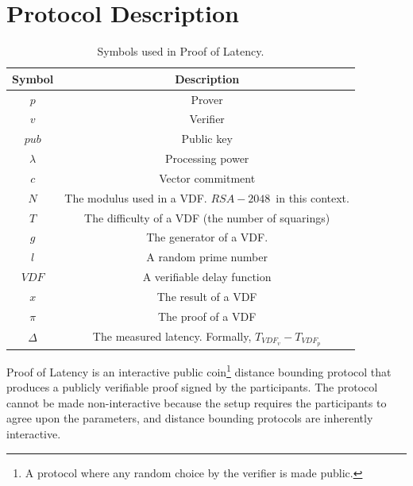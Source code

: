 \section{Protocol Description}
\begin{table}[h!]
	\centering
	\begin{tabular}{ c|c  }
		Symbol        & Description                                             \\
		\hline
		\( p \)       & Prover                                                  \\
		\( v \)       & Verifier                                                \\
		\( pub \)      & Public key                                              \\
		\( \lambda \) & Processing power                                        \\
		\( c \)       & Vector commitment                                       \\
		\( N \)       & The modulus used in a VDF. \(RSA-2048\)~in this context.   \\

		\( T \)       & The difficulty of a VDF (the number of squarings)       \\
		\( g \)       & The generator of a VDF.                                 \\
		\( l \)       & A random prime number                                   \\
		\( VDF \)     & A verifiable delay function                             \\
		\( x \)       & The result of a VDF                                     \\
		\(\pi \)      & The proof of a VDF                                      \\
		\(\Delta\)    & The measured latency. Formally, \(T_{VDF_v} - T_{VDF_p}\) \\
	\end{tabular}
	\caption{Symbols used in Proof of Latency.}
	\label{table:1}
\end{table}

Proof of Latency is an interactive public coin\footnote{A protocol where any random choice by the verifier is made public.} distance bounding protocol that produces a publicly verifiable proof signed by the participants. The protocol cannot be made non-interactive because the setup requires the participants to agree upon the parameters, and distance bounding protocols are inherently interactive.

